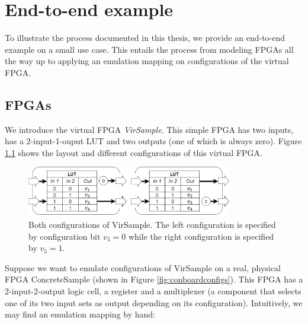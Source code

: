 \chapter{End-to-end example}
To illustrate the process documented in this thesis, we provide an end-to-end example on a small use case. This entails the process from modeling FPGAs all the way up to applying an emulation mapping on configurations of the virtual FPGA.

\section{FPGAs}
We introduce the virtual FPGA \textit{VirSample}. This simple FPGA has two inputs, has a 2-input-1-ouput LUT and two outputs (one of which is always zero). Figure \ref{fig:virboardconfigs} shows the layout and different configurations of this virtual FPGA.

\begin{figure}
\centering
\includegraphics[width=0.8\textwidth]{images/endToEnd/exampleFPGA.png}
\caption{Both configurations of VirSample. The left configuration is specified by configuration bit $v_5=0$ while the right configuration is specified by $v_5=1$.}
\label{fig:virboardconfigs}
\end{figure}

Suppose we want to emulate configurations of VirSample on a real, physical FPGA ConcreteSample (shown in Figure \ref{fig:conboardconfigs}). This FPGA has a 2-input-2-output logic cell, a register and a multiplexer (a component that selects one of its two input sets as output depending on its configuration). Intuitively, we may find an emulation mapping by hand:

